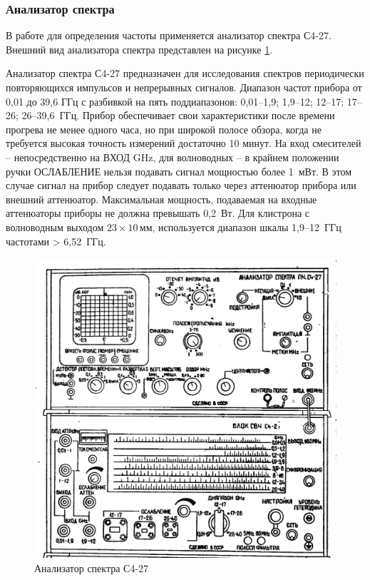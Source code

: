 \documentclass[a4paper,14pt]{extarticle}
\begin{document}
	\subsubsection{Анализатор спектра}
	
	В работе для определения частоты применяется анализатор спектра С4-27. Внешний вид анализатора спектра представлен на рисунке \ref{figa}.
	
	Анализатор спектра С4-27 предназначен для исследования спектров периодически повторяющихся импульсов и непрерывных сигналов. Диапазон частот прибора от 0,01 до 39,6 ГГц с разбивкой на пять поддиапазонов: 0,01--1,9; 1,9--12; 12--17; 17--26; 26--39,6~ГГц. Прибор обеспечивает свои характеристики после времени прогрева не менее одного часа, но при широкой полосе обзора, когда не требуется высокая точность измерений достаточно 10 минут. На вход смесителей -- непосредственно на ВХОД GHz, для волноводных -- в крайнем положении ручки ОСЛАБЛЕНИЕ нельзя подавать сигнал мощностью более 1~мВт. В этом случае сигнал на прибор следует подавать только через аттенюатор прибора или внешний аттенюатор. Максимальная мощность, подаваемая на входные аттенюаторы приборы не должна превышать 0,2~Вт. Для клистрона с волноводным выходом $23\times10\,$мм, используется диапазон шкалы 1,9--12~ГГц частотами > 6,52~ГГц.  
	
    \begin{figure}[h]
        \center
        \includegraphics[width = \textwidth]{images/s4-27.png}
        \caption{Анализатор спектра С4-27}
        \label{figa}
    \end{figure}
\end{document}
